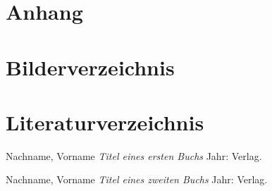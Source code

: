 \documentclass[12pt,a4paper]{scrartcl} %
\begin{document}
\section{Anhang}
\newpage





\section{Bilderverzeichnis}
\listoffigures



\newpage
\section{Literaturverzeichnis}

\begin{thebibliography}{1} %


 Nachname, Vorname {\em Titel eines ersten Buchs} Jahr: Verlag.

 Nachname, Vorname {\em Titel eines zweiten Buchs} Jahr: Verlag.



\end{thebibliography}
\end{document}
